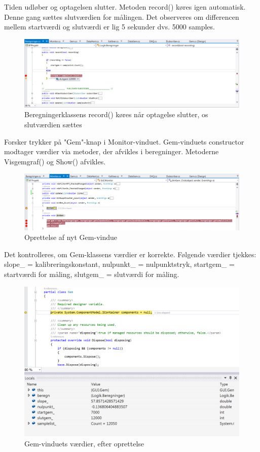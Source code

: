 Tiden udløber og optagelsen slutter. Metoden record() køres igen automatisk. Denne gang sættes slutværdien for målingen. Det observeres om differencen mellem startværdi og slutværdi er lig 5 sekunder dvs. 5000 samples.

\begin{figure}[H]
	\centering
	\includegraphics[width=1\textwidth]{Figurer/UC6_Record_Slut}
	\caption{Beregningerklassens record() køres når optagelse slutter, os slutværdien sættes}
\end{figure}

Forsker trykker på "Gem"\--knap i Monitor-vinduet. Gem-vinduets constructor modtager værdier via metoder, der afvikles i beregninger. Metoderne Visgemgraf() og Show() afvikles.

\begin{figure}[H]
	\centering
	\includegraphics[width=1\textwidth]{Figurer/UC6_BtnGem}
	\caption{Oprettelse af nyt Gem-vindue}
\end{figure}

Det kontrolleres, om Gem-klassens værdier er korrekte. Følgende værdier tjekkes: slope\_ = kalibreringskonstant, nulpunkt\_ = nulpunktstryk, startgem\_ = startværdi for måling, slutgem\_ = slutværdi for måling.

\begin{figure}[H]
	\centering
	\includegraphics[width=1\textwidth]{Figurer/UC6_Vardier}
	\caption{Gem-vinduets værdier, efter oprettelse}
\end{figure}

